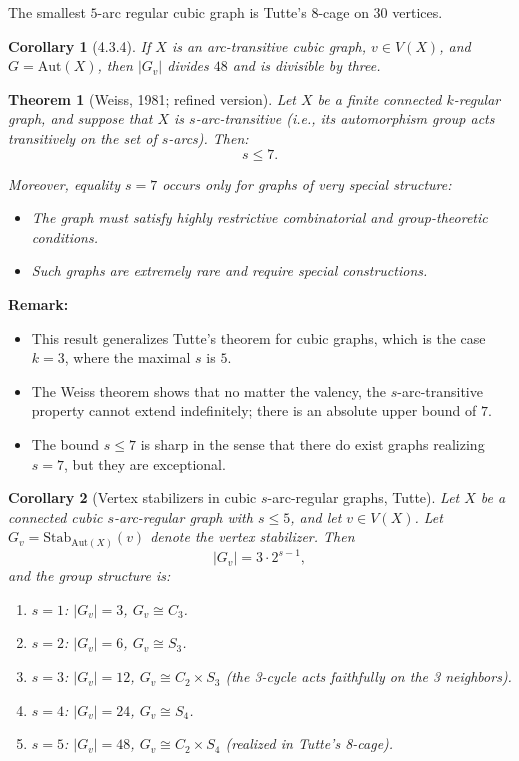 \documentclass[12pt,a4paper,openany]{book}
\newtheorem{theorem}{Theorem}[section]
\newtheorem{corollary}{Corollary}[section]
\begin{document}
The smallest $5$-arc regular cubic graph is Tutte's $8$-cage on $30$ vertices.

\begin{corollary}[4.3.4]
If $X$ is an arc-transitive cubic graph, $v \in V(X)$, and $G = \text{Aut}(X)$, then $|G_v|$ divides $48$ and is divisible by three.
\end{corollary}

\begin{theorem}[Weiss, 1981; refined version]
Let $X$ be a finite connected $k$-regular graph, and suppose that $X$ is $s$-arc-transitive
(i.e., its automorphism group acts transitively on the set of $s$-arcs). Then:
\[
s \le 7.
\]

Moreover, equality $s=7$ occurs only for graphs of very special structure:
\begin{itemize}
    \item The graph must satisfy highly restrictive combinatorial and group-theoretic conditions.
    \item Such graphs are extremely rare and require special constructions.
\end{itemize}
\end{theorem}

\noindent\textbf{Remark:}
\begin{itemize}
    \item This result generalizes Tutte's theorem for cubic graphs, which is the case $k=3$, where the maximal $s$ is $5$.
    \item The Weiss theorem shows that no matter the valency, the $s$-arc-transitive property cannot extend indefinitely; there is an absolute upper bound of $7$.
    \item The bound $s\le 7$ is sharp in the sense that there do exist graphs realizing $s=7$, but they are exceptional.
\end{itemize}


\begin{corollary}[Vertex stabilizers in cubic $s$-arc-regular graphs, Tutte]
Let $X$ be a connected cubic $s$-arc-regular graph with $s \le 5$, and let $v \in V(X)$.  
Let $G_v = \mathrm{Stab}_{\mathrm{Aut}(X)}(v)$ denote the vertex stabilizer. Then
\[
|G_v| = 3 \cdot 2^{s-1},
\]
and the group structure is:

\begin{enumerate}
    \item $s=1$: $|G_v| = 3$, \quad $G_v \cong C_3$.
    \item $s=2$: $|G_v| = 6$, \quad $G_v \cong S_3$.
    \item $s=3$: $|G_v| = 12$, \quad $G_v \cong C_2 \times S_3$ (the 3-cycle acts faithfully on the 3 neighbors).
    \item $s=4$: $|G_v| = 24$, \quad $G_v \cong S_4$.
    \item $s=5$: $|G_v| = 48$, \quad $G_v \cong C_2 \times S_4$ (realized in Tutte's 8-cage).
\end{enumerate}
\end{corollary}
\end{document}
